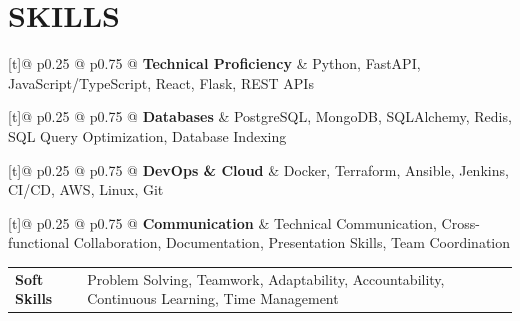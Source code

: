 \documentclass[letterpaper,11pt]{article}
\makeatletter
\newcommand{\resumeItem}[1]{
  \item{
    {#1 \vspace{-2pt}}
  }
}
\newcommand{\resumeSkillEntry}[2]{
    \begin{tabular*}{\linewidth}[t]{@{} p{0.25\textwidth} @{} p{0.75\textwidth} @{}}
      \textbf{#1} & #2 \\
    \end{tabular*}\vspace{-4pt} %
}
\newcommand{\resumeProjectHeading}[2]{
    \item %
    \begin{tabular*}{1.001\textwidth}{l@{\extracolsep{\fill}}r}
      \small#1 & \textbf{\small #2}\\
    \end{tabular*}\vspace{-8pt} %
}
\newcommand{\resumeItemListStart}{\begin{itemize}[itemsep=2pt]}
\newcommand{\resumeItemListEnd}{\end{itemize}\vspace{-5pt}}
\makeatother
\begin{document}
        
        
        
    
        
        
    \resumeSubHeadingListEnd %



\section{SKILLS}

\resumeSkillEntry{Technical Proficiency}{Python, FastAPI, JavaScript/TypeScript, React, Flask, REST APIs}

\resumeSkillEntry{Databases}{PostgreSQL, MongoDB, SQLAlchemy, Redis, SQL Query Optimization, Database Indexing}

\resumeSkillEntry{DevOps \& Cloud}{Docker, Terraform, Ansible, Jenkins, CI/CD, AWS, Linux, Git}

\resumeSkillEntry{Communication}{Technical Communication, Cross-functional Collaboration, Documentation, Presentation Skills, Team Coordination}

\resumeSkillEntry{Soft Skills}{Problem Solving, Teamwork, Adaptability, Accountability, Continuous Learning, Time Management}

\end{document}
